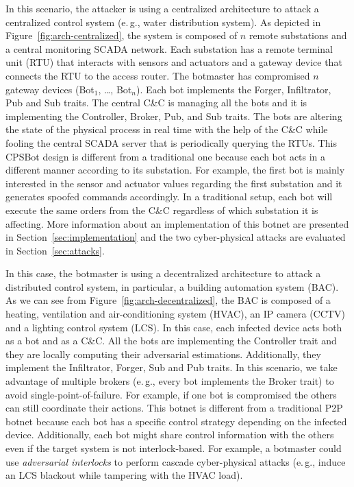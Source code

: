 \documentclass[sigconf]{acmart}
\makeatletter
\newcommand{\Paragraph}[1]{\smallskip\noindent{\bf #1.}}
\newcommand{\eg}{e.\@\,g.,\@\xspace}
\newcommand{\Botnet}{CPSBot\@\xspace}
\newcommand{\CC}{C\&C\@\xspace}
\makeatother
\begin{document}
\Paragraph{Centralized \Botnet} In this scenario, the attacker is using a
centralized architecture to attack a centralized control system (\eg water
distribution system). As depicted in Figure~\ref{fig:arch-centralized}, the
system is composed of $n$ remote substations and a central monitoring SCADA
network. Each substation has a remote terminal unit (RTU) that interacts with
sensors and actuators and a gateway device that connects the RTU to the
access router. The botmaster has compromised $n$ gateway devices (Bot$_1$,
\ldots , Bot$_n$). Each bot implements the Forger, Infiltrator, Pub and Sub
traits. The central \CC is managing all the bots and it is implementing the
Controller, Broker, Pub, and Sub traits. The bots are altering the state of
the physical process in real time with the help of the \CC while fooling
the central SCADA server that is periodically querying the RTUs. This
\Botnet design is different from a traditional one because each bot acts in
a different manner according to its substation. For example, the first bot
is mainly interested in the sensor and actuator values regarding the first
substation and it generates spoofed commands accordingly. In a traditional
setup, each bot will execute the same orders from the \CC regardless of which
substation it is affecting. More information about an implementation of
this botnet are presented in Section~\ref{sec:implementation} and the two
cyber-physical attacks are evaluated in Section~\ref{sec:attacks}.


\Paragraph{Decentralized \Botnet} In this case, the botmaster is using a
decentralized architecture to attack a distributed control system, in
particular, a building automation system (BAC). As we can see from
Figure~\ref{fig:arch-decentralized},
the BAC is composed of a heating, ventilation and air-conditioning
system (HVAC), an IP camera (CCTV) and a lighting control system (LCS). In
this case, each infected device acts both as a bot and as a \CC. All the bots
are implementing the Controller trait and they are locally computing their
adversarial estimations. Additionally, they implement the Infiltrator, Forger,
Sub and Pub traits. In this scenario, we take advantage of multiple brokers (\eg
every bot implements the Broker trait) to avoid single-point-of-failure. For
example, if one bot is compromised the others can still coordinate their
actions. This botnet is different from a traditional P2P botnet because each
bot has a specific control strategy depending on the infected device.
Additionally, each bot might share control information with the others
even if the target system is not interlock-based. For example, a botmaster
could use \emph{adversarial interlocks} to perform cascade cyber-physical
attacks (\eg induce an LCS blackout while tampering with the HVAC load).
\end{document}
